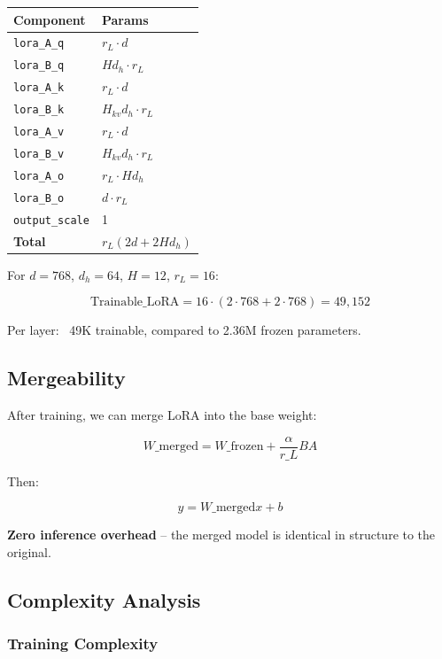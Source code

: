 \begin{table}[H]
\centering
\small
\begin{tabular}{ll}
\toprule
\textbf{Component} & \textbf{Params} \\
\midrule
\texttt{lora\_A\_q} & $r_L \cdot d$ \\
\texttt{lora\_B\_q} & $H d_h \cdot r_L$ \\
\texttt{lora\_A\_k} & $r_L \cdot d$ \\
\texttt{lora\_B\_k} & $H_{kv} d_h \cdot r_L$ \\
\texttt{lora\_A\_v} & $r_L \cdot d$ \\
\texttt{lora\_B\_v} & $H_{kv} d_h \cdot r_L$ \\
\texttt{lora\_A\_o} & $r_L \cdot H d_h$ \\
\texttt{lora\_B\_o} & $d \cdot r_L$ \\
\texttt{output\_scale} & 1 \\
\textbf{Total} & $r_L (2d + 2 H d_h)$ \\
\bottomrule
\end{tabular}
\end{table}

For $d = 768$, $d_h = 64$, $H = 12$, $r_L = 16$:

\[
\text{Trainable}\_\text{LoRA} = 16 \cdot (2 \cdot 768 + 2 \cdot 768) = 49,152
\tag{4.2}
\]

Per layer: ~49K trainable, compared to 2.36M frozen parameters.

\subsection{Mergeability}

After training, we can merge LoRA into the base weight:

\[
W\_\text{merged} = W\_\text{frozen} + \frac{\alpha}{r\_L} B A
\tag{4.3}
\]

Then:

\[
y = W\_\text{merged} x + b
\tag{4.4}
\]

\textbf{Zero inference overhead} -- the merged model is identical in structure to 
the original.

\subsection{Complexity Analysis}

\subsubsection{Training Complexity}


